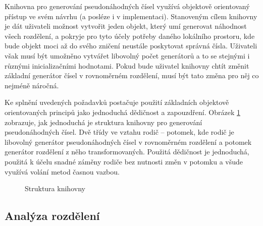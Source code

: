 \documentclass[a4paper,11pt]{article}
\begin{document}
Knihovna pro generování pseudonáhodných čísel využívá objektově orientovaný přístup ve svém návrhu (a posléze i v implementaci). Stanoveným cílem knihovny je dát uživateli možnost vytvořit jeden objekt, který umí generovat náhodnost všech rozdělení, a pokryje pro tyto účely potřeby daného lokálního prostoru, kde bude objekt moci až do svého zničení neustále poskytovat správná čísla. Uživateli však musí být umožněno vytvářet libovolný počet generátorů a to se stejnými i různými inicializačními hodnotami. Pokud bude uživatel knihovny chtít změnit základní generátor čísel v rovnoměrném rozdělení, musí být tato změna pro něj co nejméně náročná.

Ke splnění uvedených požadavků postačuje použití základních objektově orientovaných principů jako jednoduchá dědičnost a zapouzdření. Obrázek \ref{diagram1} zobrazuje, jak jednoduchá je struktura knihovny pro generování pseudonáhodných čísel. Dvě třídy ve vztahu rodič – potomek, kde rodič je libovolný generátor pseudonáhodných čísel v rovnoměrném rozdělení a potomek generátor rozdělení z něho transformovaných. Použitá dědičnost je jednoduchá, použitá k účelu snadné záměny rodiče bez nutnosti změn v potomku a všude využívá volání metod časnou vazbou.

\begin{figure}[h]
\begin{center}
\caption{\label{diagram1}Struktura knihovny}
\end{center}
\end{figure}
\subsection{Analýza rozdělení}
\end{document}
